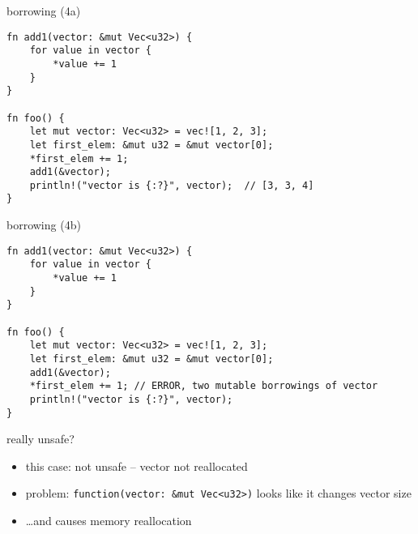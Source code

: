 \begin{frame}[fragile,label=rustBorrowing4a]{borrowing (4a)}
\begin{verbatim}
fn add1(vector: &mut Vec<u32>) {
    for value in vector {
        *value += 1
    }
}

fn foo() {
    let mut vector: Vec<u32> = vec![1, 2, 3];
    let first_elem: &mut u32 = &mut vector[0];
    *first_elem += 1;
    add1(&vector);
    println!("vector is {:?}", vector);  // [3, 3, 4]
}
\end{verbatim}
\end{frame}

\begin{frame}[fragile,label=rustBorrowing4b]{borrowing (4b)}
\begin{verbatim}
fn add1(vector: &mut Vec<u32>) {
    for value in vector {
        *value += 1
    }
}

fn foo() {
    let mut vector: Vec<u32> = vec![1, 2, 3];
    let first_elem: &mut u32 = &mut vector[0];
    add1(&vector); 
    *first_elem += 1; // ERROR, two mutable borrowings of vector
    println!("vector is {:?}", vector);  
}
\end{verbatim}
\end{frame}

\begin{frame}[fragile]{really unsafe?}
    \begin{itemize}
    \item this case: not unsafe -- vector not reallocated
    \vspace{.5cm}
    \item problem: \verb|function(vector: &mut Vec<u32>)| looks like it changes vector size
    \item \ldots and causes memory reallocation
    \end{itemize}
\end{frame}

